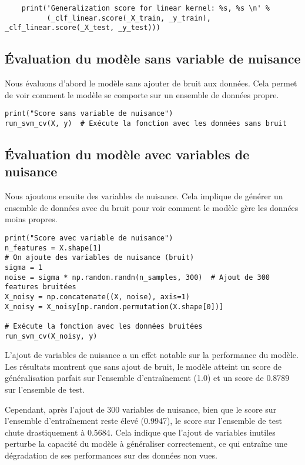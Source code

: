 \documentclass{article}
\begin{document}
\begin{itemize}
\begin{verbatim}
    print('Generalization score for linear kernel: %s, %s \n' %
          (_clf_linear.score(_X_train, _y_train), _clf_linear.score(_X_test, _y_test)))
\end{verbatim}

\subsection{Évaluation du modèle sans variable de nuisance}

Nous évaluons d'abord le modèle sans ajouter de bruit aux données. Cela 
permet de voir comment le modèle se comporte sur un ensemble de données 
propre.

\begin{verbatim}
print("Score sans variable de nuisance")
run_svm_cv(X, y)  # Exécute la fonction avec les données sans bruit
\end{verbatim}


\subsection{Évaluation du modèle avec variables de nuisance}

Nous ajoutons ensuite des variables de nuisance. Cela implique de générer
un ensemble de données avec du bruit pour voir comment le modèle gère les 
données moins propres.

\begin{verbatim}
print("Score avec variable de nuisance")
n_features = X.shape[1]
# On ajoute des variables de nuisance (bruit)
sigma = 1
noise = sigma * np.random.randn(n_samples, 300)  # Ajout de 300 features bruitées
X_noisy = np.concatenate((X, noise), axis=1)
X_noisy = X_noisy[np.random.permutation(X.shape[0])]

# Exécute la fonction avec les données bruitées
run_svm_cv(X_noisy, y)
\end{verbatim}

L'ajout de variables de nuisance a un effet notable sur la performance du
modèle. Les résultats montrent que sans ajout de bruit, le modèle atteint 
un score de généralisation parfait sur l'ensemble d'entraînement (1.0) et 
un score de 0.8789 sur l'ensemble de test.

Cependant, après l'ajout de 300 variables de nuisance, bien que le score 
sur l'ensemble d'entraînement reste élevé (0.9947), le score sur 
l'ensemble de test chute drastiquement à 0.5684. Cela indique que l'ajout 
de variables inutiles perturbe la capacité du modèle à généraliser 
correctement, ce qui entraîne une dégradation de ses performances sur des 
données non vues.


\end{itemize}
\end{document}

